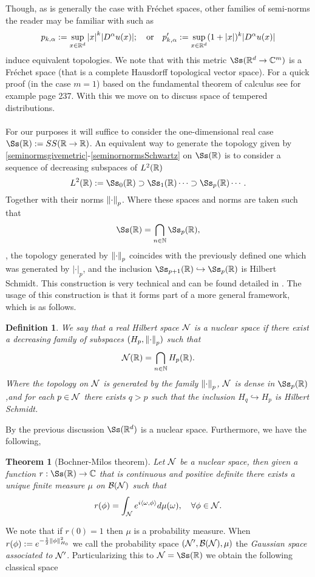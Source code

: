 \documentclass[12pt]{article}
\newtheorem{theorem}{Theorem}
\newtheorem{definition}{Definition}
\newcommand{\br}[1]{\left\langle#1\right\rangle}
\begin{document}
Though, as is generally the case with Fréchet spaces, other families of semi-norms the reader may be familiar with such as
\[p_{k,\alpha}:=\sup_{x\in{\mathbb R}^d}\abs{x}^k \abs{D^\alpha u(x)};\quad\text{or}\quad p'_{k,\alpha}:=\sup_{x\in{\mathbb R}^d}(1+\abs{x})^k \abs{D^\alpha u(x)}\]
induce equivalent topologies. We note that with this metric $\Ss(\R^d\to\C^m)$ is a Fréchet space (that is a complete Hausdorff topological vector space). For a quick proof (in the case $m=1$) based on the fundamental theorem of calculus see for example \cite{Foll} page 237.
\bigbreak With this we move on to discuss space of tempered distributions.\\
\\
For our purposes it will suffice to consider the one-dimensional real case $\Ss(\R):=SS(\R\to\R)$. An equivalent way to generate the topology given by \eqref{seminormsgivemetric}-\eqref{seminornormsSchwartz} on $\Ss(\R)$ is to consider a sequence of decreasing  subspaces of $L^2({\mathbb R})$
\begin{equation*}
	L^2(\R):=\Ss_0(\R)\supset \Ss_1(\R)\cdots\supset \Ss_p(\R)\cdots.
\end{equation*}
Together with their norms $\norm{\cdot }_p$. Where these spaces and norms are taken such that
\begin{equation*}
	\Ss(\R)=\bigcap_{n \in \N}\Ss_p(\R),
\end{equation*}
, the topology generated by $\norm{\cdot }_p$ coincides with the previously defined one which was generated by $|\cdot |_p$, and the inclusion $\Ss_{p+1}(\R)\hookrightarrow \Ss_p(\R)$ is Hilbert Schmidt. This construction is very technical and can be found detailed in \cite{becnel2004schwartz}. The usage of this construction is that it forms part of a more general framework, which is as follows.
\begin{definition}
	We say that a real Hilbert space $\mathcal{N}$ is a nuclear space if there exist a decreasing family of subspaces $(H_p,\norm{\cdot }_p)$ such that
	\begin{equation*}
		\mathcal{N}({\mathbb R})=\bigcap_{n \in \mathbb{N}}H_p({\mathbb R}).
	\end{equation*}
	Where the topology on $\mathcal{N}$ is generated by the family $\norm{\cdot }_p$, $\mathcal{N}$ is dense in $\Ss_p(\R)$,and for each $p \in \mathcal{N}$ there exists $q>p$ such that the inclusion  $H_q\hookrightarrow H_p$ is Hilbert Schmidt.
\end{definition}
By the previous discussion $\Ss(\R^d)$ is a nuclear space. Furthermore, we have the following,
\begin{theorem}[Bochner-Milos theorem]
	Let $\mathcal{N}$ be a nuclear space, then given a function $r:\Ss(\R)\to\C$ that is continuous and positive definite there exists a unique finite measure $\mu $ on $\mathcal{B}(\mathcal{N})$ such that
	\begin{equation*}
		r(\phi)= \int_{\Nn} e^{i\br{\omega,\phi}}d \mu(\omega),\quad\forall \phi\in \Nn.
	\end{equation*}
\end{theorem}
We note that if $r(0)=1$ then  $\mu $ is a probability measure. When $r(\phi):=e^{-\frac{1}{2}\norm{\phi}_{H_0}^2}$ we call the probability space $(\mathcal{N}',\mathcal{B}(\mathcal{N}),\mu )$ the \emph{Gaussian space associated to $\mathcal{N}'$}. Particularizing this to $\Nn=\Ss(\R)$ we obtain the following classical space
\end{document}
